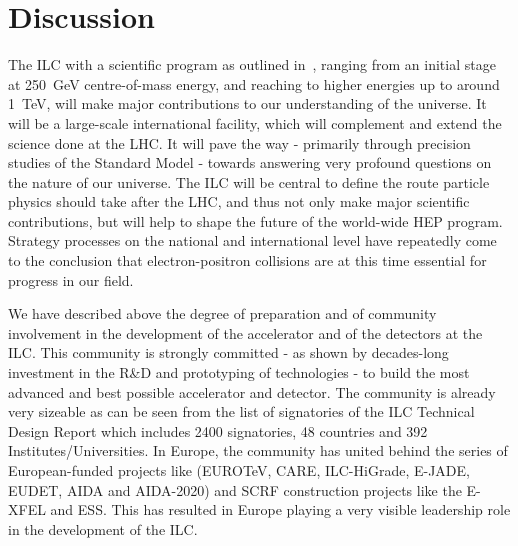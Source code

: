 \documentclass[%
 reprint,
 floatfix,
 amsmath,amssymb,
 aps,
]{revtex4-1}
\begin{document}
\section{\label{sec:discussion}Discussion}
The ILC with a scientific program as outlined in~\cite{ILCESU1}, ranging from 
an initial stage at 250~GeV centre-of-mass energy, and reaching to higher 
energies up to around 1~TeV, will make major contributions to our understanding of the universe. It will be a large-scale international facility, which will 
complement and extend the science done at the LHC. It will pave the way - 
primarily through precision studies of the Standard Model - towards answering 
very profound questions on the nature of our universe. The ILC will be central to 
define the route particle physics should take after the LHC, and thus not only 
make major scientific contributions, but will help to shape the future of the 
world-wide HEP program. Strategy processes on the national and 
international level have repeatedly come to the conclusion that electron-positron collisions 
are at this time essential for progress in our field. 


We have described above the degree of preparation and of community involvement 
in the development of the accelerator and of the detectors at the ILC. This 
community is strongly committed - as shown by decades-long investment in the 
R\&D and prototyping of technologies - to build the most advanced and best 
possible accelerator and detector. The community is already very sizeable as can be seen from the list of signatories of the ILC Technical Design Report which includes 2400 signatories, 48 countries and 392 Institutes/Universities. In Europe, the community has united behind the 
series of  European-funded projects like (EUROTeV, CARE, ILC-HiGrade, E-JADE, EUDET, AIDA and AIDA-2020) and SCRF construction projects like the E-XFEL and ESS. This has 
resulted in Europe playing a very visible leadership role in the development of the ILC.



\end{document}
